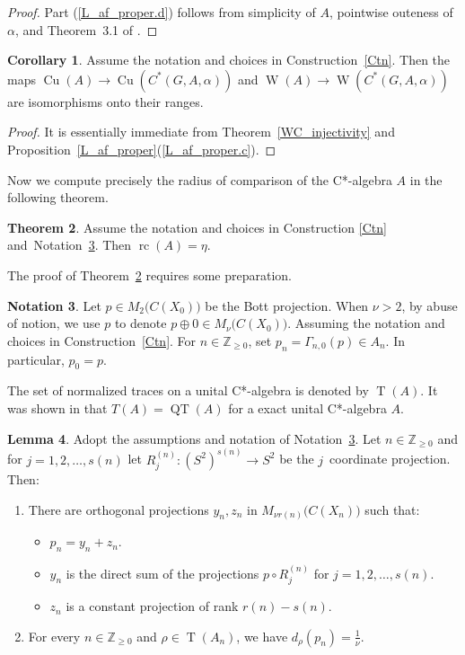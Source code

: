 \documentclass[10pt]{amsart}
\numberwithin{equation}{section}
\theoremstyle{definition}
\newtheorem{thm}{Theorem}[section]
\newtheorem{lem}[thm]{Lemma}
\newtheorem{cor}[thm]{Corollary}
\newtheorem{ntn}[thm]{Notation}
\newcommand{\Nz}{{\mathbb{Z}}_{\geq 0}}
\newcommand{\Cu}{{\operatorname{Cu}}}
\newcommand{\QT}{{\operatorname{QT}}}
\newcommand{\T}{{\operatorname{T}}}
\newcommand{\W}{{\operatorname{W}}}
\newcommand{\rc}{{\operatorname{rc}}}
\newcommand{\Ntn}[1]{Notation~\ref{#1}}
\begin{document}
\begin{proof}
Part (\ref{L_af_proper.d}) follows from simplicity of $A$, pointwise outeness of $\alpha$, and Theorem~3.1 of \cite{Ks1}.
\end{proof}
%
\begin{cor}\label{C_9422_IsomsInExample}
Assume the notation and choices in
Construction~\ref{Ctn}.
Then the maps
$\Cu (A) \to \Cu \left(C^*(G, A, \alpha)\right)$
and $\W (A) \to \W \left(C^*(G, A, \alpha)\right)$
are  isomorphisms onto their ranges.
\end{cor}

\begin{proof}
It is  essentially immediate from Theorem~\ref{WC_injectivity}
 and Proposition~\ref{L_af_proper}(\ref{L_af_proper.c}).
\end{proof}
%
Now we compute precisely the radius of comparison of the C*-algebra $A$ in the following theorem. 
%
\begin{thm}\label{rc.ctn.20200325}
Assume the notation and choices in Construction
\ref{Ctn} and~\Ntn{Eq3.Bott}.
Then $\rc (A) =\eta$.
\end{thm}
The proof of Theorem~\ref{rc.ctn.20200325} requires some preparation.
%
\begin{ntn}\label{Eq3.Bott}
Let $p \in M_2 \big(C (X_0)\big)$ be the Bott projection.
When $\nu>2$, by abuse of notion, we use $p$ to denote $p\oplus 0 \in M_{\nu} \big(C(X_0)\big)$.
Assuming the notation and choices in
Construction~\ref{Ctn}.
For $n \in \Nz$,
set $p_n =  \Gamma_{n, 0} (p) \in A_{n}$.
In particular, $p_0 = p$.
\end{ntn}
%
The set of normalized traces on a unital C*-algebra is denoted by $\T (A)$.
It was shown in \cite{Hag14} that $T(A)=\QT(A)$ for a exact unital C*-algebra $A$.
%
\begin{lem}\label{ProjectionRank22'}
Adopt the assumptions and notation
of Notation~\ref{Eq3.Bott}.
Let $n \in \Nz$ and for $j = 1, 2, \ldots, s (n)$
let $R_j^{(n)} \colon (S^2)^{s (n)} \to S^2$
be the $j$~coordinate projection.
Then:
\begin{enumerate}
\item
\label{ProjectionRank22_a'}
There are orthogonal projections $y_{n}, z_{n}$ in
$M_{\nu r (n)} \big( C (X_n) \big)$
such that:
\begin{itemize}
\item
$p_n = y_{n} + z_{n}$.
\item
 $y_{n}$ is
the direct sum of the projections
$p \circ R^{(n)}_{j}$ for $j = 1, 2, \ldots, s (n)$. 
\item
$z_{n}$ is a constant projection of rank $r (n) - s (n)$.
\end{itemize}
%
\item
\label{ProjectionRank22_b'}
For every $n \in \Nz$ and $\rho \in \T (A_{n})$, we have
$d_{\rho} (p_n) = \frac{1 }{\nu}$.
\end{enumerate}
\end{lem}
\end{document}
